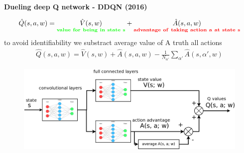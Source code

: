 \documentclass[xcolor=dvipsnames]{beamer}
\begin{document}
\begin{frame}{\bf Dueling deep Q network - DDQN (2016)}

\begin{align*}
  \hat{Q}(s, a, w) = \underset{\bf \color{green} value\ for\ being\ in\ state\ s}{\hat{V}(s, w)} + \underset{\bf \color{red} advantage\ of\ taking\ action\ a\ at\ state\ s}{\hat{A}(s, a, w)}
\end{align*}
to avoid identifiability we substract average value of A truth all actions
\begin{align*}
  \hat{Q}(s, a, w) = \hat{V}(s, w) + \hat{A}(s, a, w) - \frac{1}{N_{\alpha'}} \sum_{\alpha'} \hat{A}(s, \alpha', w)
\end{align*}

\begin{figure}[!htb]
  \centering
  \includegraphics[scale=0.3]{../../diagrams/dueling_dqn_0.png}
  \label{img:ddqn_principle}
\end{figure}

\end{frame}
\end{document}
